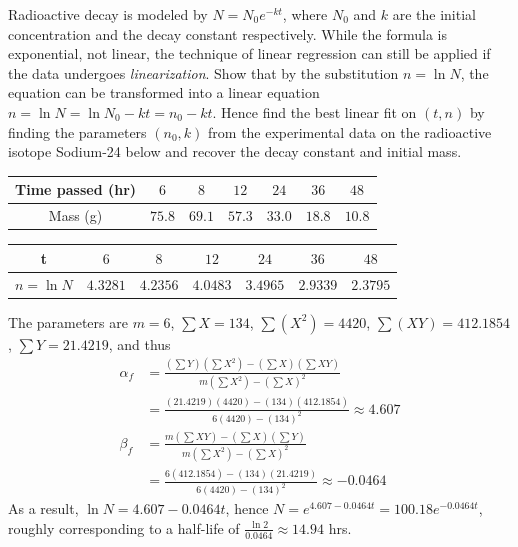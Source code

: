 \begin{Exercise}
\label{ex:radioactive}
Radioactive decay is modeled by $N = N_0e^{-kt}$, where $N_0$ and $k$ are the initial concentration and the decay constant respectively. While the formula is exponential, not linear, the technique of linear regression can still be applied if the data undergoes \textit{linearization}. Show that by the substitution $n = \ln N$, the equation can be transformed into a linear equation $n = \ln N = \ln N_0 - kt = n_0 - kt$. Hence find the best linear fit on $(t, n)$ by finding the parameters $(n_0, k)$ from the experimental data on the radioactive isotope Sodium-24 below and recover the decay constant and initial mass.
\begin{center}
\begin{tabular}{|c|c|c|c|c|c|c|}
\hline
Time passed (hr) & $6$ & $8$ & $12$ & $24$ & $36$ & $48$\\
\hline
Mass (g) & $75.8$ & $69.1$ & $57.3$ & $33.0$ & $18.8$ & $10.8$\\
\hline
\end{tabular}
\end{center}
\end{Exercise}
\begin{Answer}
\begin{center}
\begin{tabular}{|c|c|c|c|c|c|c|}
\hline
t & $6$ & $8$ & $12$ & $24$ & $36$ & $48$\\
\hline
$n = \ln N$ & $4.3281$ & $4.2356$ & $4.0483$ & $3.4965$ & $2.9339$ & $2.3795$ \\
\hline
\end{tabular}
\end{center}
The parameters are $m=6$, $\sum X=134$, $\sum (X^2)=4420$, $\sum (XY)=412.1854$, $\sum Y=21.4219$, and thus
\begin{align*}
\alpha_f &= \frac{(\sum Y) (\sum X^2) - (\sum X) (\sum XY)}{m(\sum X^2) - (\sum X)^2} \\
&= \frac{(21.4219) (4420) - (134) (412.1854)}{6(4420) - (134)^2} \approx 4.607 \\
\beta_f &= \frac{m (\sum XY) - (\sum X) (\sum Y)}{m(\sum X^2) - (\sum X)^2} \\
&= \frac{6(412.1854) - (134) (21.4219)}{6(4420) - (134)^2} \approx -0.0464
\end{align*}
As a result, $\ln N = 4.607 - 0.0464t$, hence $N = e^{4.607 - 0.0464t} = 100.18e^{-0.0464t}$, roughly corresponding to a half-life of $\frac{\ln2}{0.0464} \approx 14.94$ hrs.
\end{Answer}

